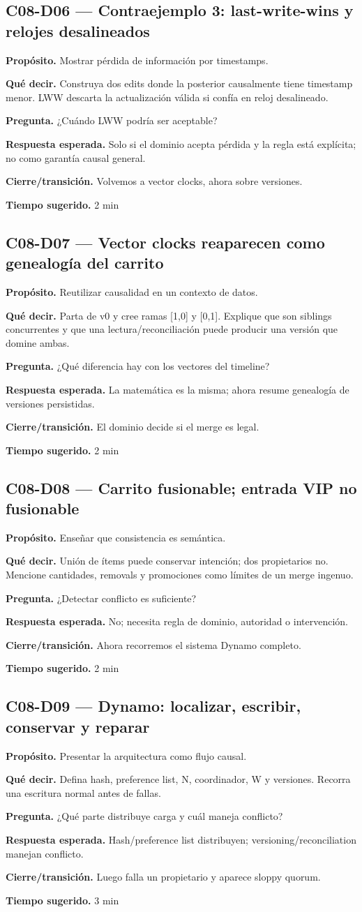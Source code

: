 \documentclass[variant=docente,cover=institutional,mode=screen]{ua-engineering-v6-article}
\newcommand{\FrameField}[2]{\par\noindent\textbf{#1.} #2\par}
\begin{document}
\subsection*{C08-D06 --- Contraejemplo 3: last-write-wins y relojes desalineados}
\FrameField{Propósito}{Mostrar pérdida de información por timestamps.}
\FrameField{Qué decir}{Construya dos edits donde la posterior causalmente tiene timestamp menor. LWW descarta la actualización válida si confía en reloj desalineado.}
\FrameField{Pregunta}{¿Cuándo LWW podría ser aceptable?}
\FrameField{Respuesta esperada}{Solo si el dominio acepta pérdida y la regla está explícita; no como garantía causal general.}
\FrameField{Cierre/transición}{Volvemos a vector clocks, ahora sobre versiones.}
\FrameField{Tiempo sugerido}{2 min}

\subsection*{C08-D07 --- Vector clocks reaparecen como genealogía del carrito}
\FrameField{Propósito}{Reutilizar causalidad en un contexto de datos.}
\FrameField{Qué decir}{Parta de v0 y cree ramas [1,0] y [0,1]. Explique que son siblings concurrentes y que una lectura/reconciliación puede producir una versión que domine ambas.}
\FrameField{Pregunta}{¿Qué diferencia hay con los vectores del timeline?}
\FrameField{Respuesta esperada}{La matemática es la misma; ahora resume genealogía de versiones persistidas.}
\FrameField{Cierre/transición}{El dominio decide si el merge es legal.}
\FrameField{Tiempo sugerido}{2 min}

\subsection*{C08-D08 --- Carrito fusionable; entrada VIP no fusionable}
\FrameField{Propósito}{Enseñar que consistencia es semántica.}
\FrameField{Qué decir}{Unión de ítems puede conservar intención; dos propietarios no. Mencione cantidades, removals y promociones como límites de un merge ingenuo.}
\FrameField{Pregunta}{¿Detectar conflicto es suficiente?}
\FrameField{Respuesta esperada}{No; necesita regla de dominio, autoridad o intervención.}
\FrameField{Cierre/transición}{Ahora recorremos el sistema Dynamo completo.}
\FrameField{Tiempo sugerido}{2 min}

\subsection*{C08-D09 --- Dynamo: localizar, escribir, conservar y reparar}
\FrameField{Propósito}{Presentar la arquitectura como flujo causal.}
\FrameField{Qué decir}{Defina hash, preference list, N, coordinador, W y versiones. Recorra una escritura normal antes de fallas.}
\FrameField{Pregunta}{¿Qué parte distribuye carga y cuál maneja conflicto?}
\FrameField{Respuesta esperada}{Hash/preference list distribuyen; versioning/reconciliation manejan conflicto.}
\FrameField{Cierre/transición}{Luego falla un propietario y aparece sloppy quorum.}
\FrameField{Tiempo sugerido}{3 min}
\end{document}
